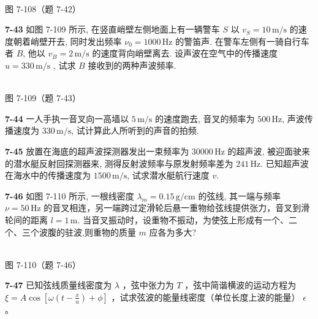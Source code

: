 \begin{center}
\resizebox{0.50\textwidth}{!}{}\\[4pt]
{\small 图 7-108（题 7-42）}
\end{center}

\newpage

\textbf{7-43} 如图 7-109 所示, 在竖直峭壁左侧地面上有一辆警车 $S$ 以 $v_{S}=10\,\mathrm{m/s}$ 的速度朝着峭壁开去, 同时发出频率 $\nu_{0}=1000\,\mathrm{Hz}$ 的警笛声. 在警车左侧有一骑自行车者 $B$, 他以 $v_{B}=2\,\mathrm{m/s}$ 的速度背向峭壁离去. 设声波在空气中的传播速度 $u=330\,\mathrm{m/s}$ , 试求 $B$ 接收到的两种声波频率.

\begin{center}
\resizebox{0.50\textwidth}{!}{}\\[4pt]
{\small 图 7-109（题 7-43）}
\end{center}

\newpage

\textbf{7-44} 一人手执一音叉向一高墙以 $5\,\mathrm{m/s}$ 的速度跑去, 音叉的频率为 $500\,\mathrm{Hz}$, 声波传播速度为 $330\,\mathrm{m/s}$, 试计算此人所听到的声音的拍频.

\newpage

\textbf{7-45} 放置在海底的超声波探测器发出一束频率为 $30000\,\mathrm{Hz}$ 的超声波, 被迎面驶来的潜水艇反射回探测器来, 测得反射波频率与原发射频率差为 $241\,\mathrm{Hz}$. 已知超声波在海水中的传播速度为 $1500\,\mathrm{m/s}$, 试求潜水艇航行速度 $v$.

\newpage

\textbf{7-46} 如图 7-110 所示, 一根线密度 $\lambda_{m}=0.15\,\mathrm{g/cm}$ 的弦线, 其一端与频率 $\nu=50\,\mathrm{Hz}$ 的音叉相连，另一端跨过定滑轮后悬一重物给弦线提供张力，音叉到滑轮间的距离 $l=1\,\mathrm m$. 当音叉振动时，设重物不振动，为使弦上形成有一个、二个、三个波腹的驻波,则重物的质量 $m$ 应各为多大?

\begin{center}
\resizebox{0.50\textwidth}{!}{}\\[4pt]
{\small 图 7-110（题 7-46）}
\end{center}

\newpage

\textbf{7-47} 已知弦线质量线密度为 $\lambda$ ，弦中张力为 $T$ ，弦中简谐横波的运动方程为 $\xi = A\cos\left[\omega\left(t-\frac{x}{u}\right)+\phi\right]$ ，试求弦波的能量线密度（单位长度上波的能量） $\epsilon$ 。

